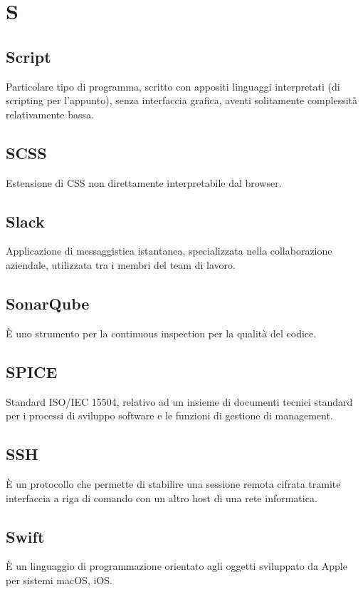 \section*{S}

\subsection{Script}
Particolare tipo di programma, scritto con appositi linguaggi interpretati (di scripting per l'appunto), senza interfaccia grafica, aventi solitamente complessità relativamente bassa.

\subsection{SCSS}
Estensione di CSS non direttamente interpretabile dal browser.

\subsection{Slack}
Applicazione di messaggistica istantanea, specializzata nella collaborazione aziendale, utilizzata tra i membri del team di lavoro.

\subsection{SonarQube} 
È uno strumento per la continuous inspection per la qualità del codice.

\subsection{SPICE}
Standard ISO/IEC 15504, relativo ad un insieme di documenti tecnici standard per i processi di sviluppo software e le funzioni di gestione di management.

\subsection{SSH}
È un protocollo che permette di stabilire una sessione remota cifrata tramite interfaccia a riga di comando con un altro host di una rete informatica.

\subsection{Swift}
È un linguaggio di programmazione orientato agli oggetti sviluppato da Apple per sistemi macOS, iOS.
